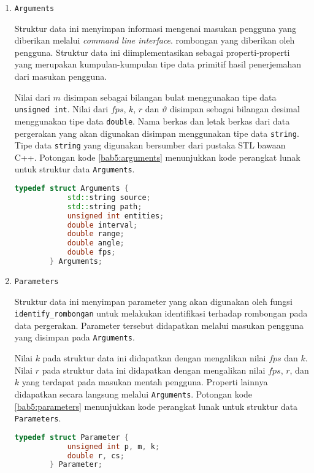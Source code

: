 \begin{enumerate}
    \item \texttt{Arguments}
    
    Struktur data ini menyimpan informasi mengenai masukan pengguna yang diberikan melalui \textit{command line interface}. rombongan yang diberikan oleh pengguna. Struktur data ini diimplementasikan sebagai properti-properti yang merupakan kumpulan-kumpulan tipe data primitif hasil penerjemahan dari masukan pengguna.
    
    Nilai dari $m$ disimpan sebagai bilangan bulat menggunakan tipe data \texttt{unsigned int}. Nilai dari $fps$, $k$, $r$ dan $\vartheta$ disimpan sebagai bilangan desimal menggunakan tipe data \texttt{double}. Nama berkas dan letak berkas dari data pergerakan yang akan digunakan disimpan menggunakan tipe data \texttt{string}. Tipe data \texttt{string} yang digunakan bersumber dari pustaka STL bawaan C++. Potongan kode \ref{bab5:arguments} menunjukkan kode perangkat lunak untuk struktur data \texttt{Arguments}. 
    
    \begin{lstlisting}[language=C++, caption=Implementasi \texttt{Arguments}, label={bab5:arguments}]
        typedef struct Arguments {
            std::string source;
            std::string path;
            unsigned int entities;
            double interval;
            double range;
            double angle;
            double fps;
        } Arguments;
    \end{lstlisting}
    
    \item \texttt{Parameters}
    
    Struktur data ini menyimpan parameter yang akan digunakan oleh fungsi \texttt{identify\_rombongan} untuk melakukan identifikasi terhadap rombongan pada data pergerakan. Parameter tersebut didapatkan melalui masukan pengguna yang disimpan pada \texttt{Arguments}.
    
    Nilai $k$ pada struktur data ini didapatkan dengan mengalikan nilai $fps$ dan $k$. Nilai $r$ pada struktur data ini didapatkan dengan mengalikan nilai $fps$, $r$, dan $k$ yang terdapat pada masukan mentah pengguna. Properti lainnya didapatkan secara langsung melalui \texttt{Arguments}. Potongan kode \ref{bab5:parameters} menunjukkan kode perangkat lunak untuk struktur data \texttt{Parameters}.
    
    \begin{lstlisting}[language=C++, caption=Implementasi \texttt{Parameters}, label={bab5:parameters}]
        typedef struct Parameter {
            unsigned int p, m, k;
            double r, cs;
        } Parameter;
    \end{lstlisting}
    

\end{enumerate}
